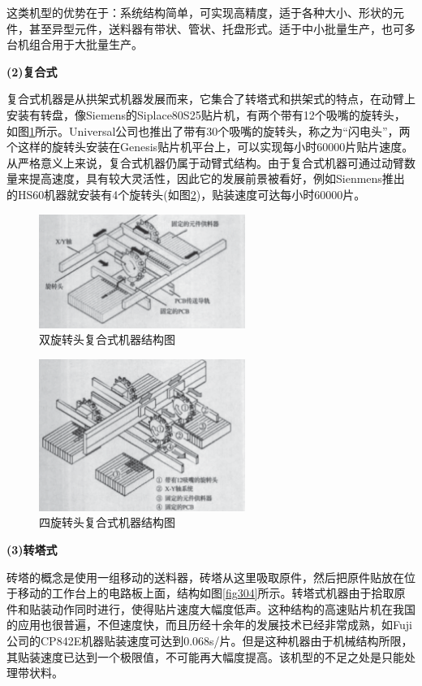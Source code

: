 \documentclass[a4paper]{article}%
\begin{document}
\begin{CJK}{UTF8}{gbsn}
这类机型的优势在于：系统结构简单，可实现高精度，适于各种大小、形状的元件，甚至异型元件，送料器有带状、管状、托盘形式。适于中小批量生产，也可多台机组合用于大批量生产。

\textbf{(2)复合式}

复合式机器是从拱架式机器发展而来，它集合了转塔式和拱架式的特点，在动臂上安装有转盘，像Siemens的Siplace80S25贴片机，有两个带有12个吸嘴的旋转头，如图\ref{fig302}所示。Universal公司也推出了带有30个吸嘴的旋转头，称之为“闪电头”，两个这样的旋转头安装在Genesis贴片机平台上，可以实现每小时60000片贴片速度。从严格意义上来说，复合式机器仍属于动臂式结构。由于复合式机器可通过动臂数量来提高速度，具有较大灵活性，因此它的发展前景被看好，例如Sienmens推出的HS60机器就安装有4个旋转头(如图\ref{fig303})，贴装速度可达每小时60000片。
\begin{figure}[htb!]
\centering
\includegraphics[width=0.6\textwidth]{fig302.eps}
\caption{双旋转头复合式机器结构图}
\label{fig302}
\end{figure}
\begin{figure}[htb!]
\centering
\includegraphics[width=0.6\textwidth]{fig303.eps}
\caption{四旋转头复合式机器结构图}
\label{fig303}
\end{figure}

\textbf{(3)转塔式}

砖塔的概念是使用一组移动的送料器，砖塔从这里吸取原件，然后把原件贴放在位于移动的工作台上的电路板上面，结构如图\ref{fig304}所示。转塔式机器由于拾取原件和贴装动作同时进行，使得贴片速度大幅度低声。这种结构的高速贴片机在我国的应用也很普遍，不但速度快，而且历经十余年的发展技术已经非常成熟，如Fuji公司的CP842E机器贴装速度可达到0.068s/片。但是这种机器由于机械结构所限，其贴装速度已达到一个极限值，不可能再大幅度提高。该机型的不足之处是只能处理带状料。


\end{CJK}
\end{document}
